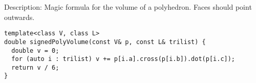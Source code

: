 Description: Magic formula for the volume of a polyhedron. Faces should point outwards.
\begin{verbatim}
template<class V, class L>
double signedPolyVolume(const V& p, const L& trilist) {
  double v = 0;
  for (auto i : trilist) v += p[i.a].cross(p[i.b]).dot(p[i.c]);
  return v / 6;
}
\end{verbatim}
